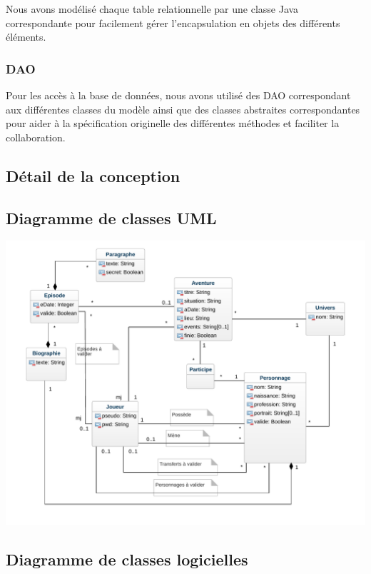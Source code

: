 \documentclass[a4paper, 11pt, titlepage]{article}
\begin{document}
Nous avons modélisé chaque table relationnelle par une classe Java correspondante pour facilement gérer l'encapsulation en objets des différents éléments.


\subsubsection {DAO}

Pour les accès à la base de données, nous avons utilisé des DAO correspondant aux différentes classes du modèle ainsi que des classes abstraites correspondantes pour aider à la spécification originelle des différentes méthodes et faciliter la collaboration.



\subsection {Détail de la conception}

\subsection {Diagramme de classes UML}

\includegraphics[scale=0.7]{conception/classes}


\subsection {Diagramme de classes logicielles}

\end{document}
